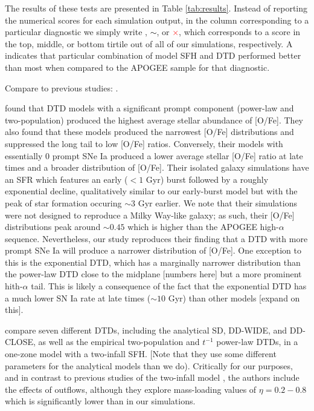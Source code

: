 \documentclass[modern,linenumbers]{aastex631}
\newcommand{\yes}{\textcolor{green}{\checkmark}}
\newcommand{\meh}{\textcolor{black}{$\sim$}}
\newcommand{\no}{\textcolor{red}{$\times$}}
\begin{document}
The results of these tests are presented in Table \ref{tab:results}. Instead of reporting the numerical scores for each simulation output, in the column corresponding to a particular diagnostic we simply write \yes, \meh, or \no, which corresponds to a score in the top, middle, or bottom tirtile out of all of our simulations, respectively. A \yes indicates that particular combination of model SFH and DTD performed better than most when compared to the APOGEE sample for that diagnostic.


Compare to previous studies: \citet{Poulhazan2018-PrecisionPollution,Palicio2023-AnalyticDTD}.

\citet{Poulhazan2018-PrecisionPollution} found that DTD models with a significant prompt component (power-law and two-population) produced the highest average stellar abundance of [O/Fe]. They also found that these models produced the narrowest [O/Fe] distributions and suppressed the long tail to low [O/Fe] ratios. Conversely, their models with essentially 0 prompt SNe Ia produced a lower average stellar [O/Fe] ratio at late times and a broader distribution of [O/Fe]. Their isolated galaxy simulations have an SFR which features an early ($<1$ Gyr) burst followed by a roughly exponential decline, qualitatively similar to our early-burst model but with the peak of star formation occuring $\sim3$ Gyr earlier. We note that their simulations were not designed to reproduce a Milky Way-like galaxy; as such, their [O/Fe] distributions peak around $\sim0.45$ which is higher than the APOGEE high-$\alpha$ sequence. Nevertheless, our study reproduces their finding that a DTD with more prompt SNe Ia will produce a narrower distribution of [O/Fe]. One exception to this is the exponential DTD, which has a marginally narrower distribution than the power-law DTD close to the midplane [numbers here] but a more prominent hith-$\alpha$ tail. This is likely a consequence of the fact that the exponential DTD has a much lower SN Ia rate at late times ($\sim10$ Gyr) than other models [expand on this].

\citet{Palicio2023-AnalyticDTD} compare seven different DTDs, including the analytical SD, DD-WIDE, and DD-CLOSE, as well as the empirical two-population and $t^{-1}$ power-law DTDs, in a one-zone model with a two-infall SFH. [Note that they use some different parameters for the analytical models than we do). Critically for our purposes, and in contrast to previous studies of the two-infall model \citep[e.g.,][others]{Chiappini1997-TwoInfall,Spitoni2021-TwoInfall}, the authors include the effects of outflows, although they explore mass-loading values of $\eta=0.2-0.8$ which is significantly lower than in our simulations.
\end{document}
